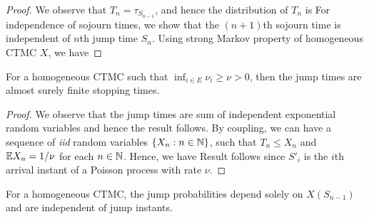 \documentclass[a4paper,10pt,english]{article}
\begin{document}
\begin{proof}
We observe that $T_n = \tau_{S_{n-1}}$, and hence the distribution of $T_n$ is 
For independence of sojourn times, we show that the $(n+1)$th sojourn time is independent of $n$th jump time $S_n$. 
Using strong Markov property of homogeneous CTMC $X$, we have 
\end{proof}
\begin{cor} 
For a homogeneous CTMC such that $\inf_{i \in E} \nu_i \geq \nu > 0$, then the jump times are almost surely finite stopping times. 
\end{cor}
\begin{proof}
We observe that the jump times are sum of independent exponential random variables and hence the result follows. 
By coupling, we can have a sequence of \textit{iid} random variables $\{X_n: n \in \mathbb{N}\}$, 
such that $T_n \leq X_n$ and $\mathbb{E} X_n = 1/\nu$ for each $n \in \mathbb{N}$. 
Hence, we have 
Result follows since $S'_i$ is the $i$th arrival instant of a Poisson process with rate $\nu$. 
\end{proof}
\begin{lem}
\label{Lemma:JumpProb}
For a homogeneous CTMC, the jump probabilities depend solely on $X(S_{n-1})$ and are independent of jump instants.  
\end{lem}
\end{document}
